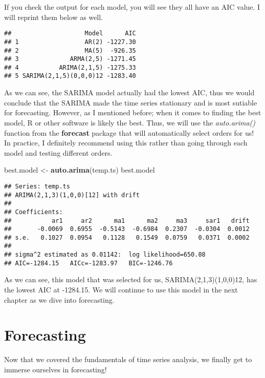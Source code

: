 \documentclass[
]{book}
\newenvironment{Shaded}{\begin{snugshade}}{\end{snugshade}}
\newcommand{\KeywordTok}[1]{\textcolor[rgb]{0.13,0.29,0.53}{\textbf{#1}}}
\newcommand{\NormalTok}[1]{#1}
\newcommand{\StringTok}[1]{\textcolor[rgb]{0.31,0.60,0.02}{#1}}
\begin{document}
If you check the output for each model, you will see they all have an AIC value. I will reprint them below as well.

\begin{verbatim}
##                    Model      AIC
## 1                  AR(2) -1227.30
## 2                  MA(5)  -926.35
## 3              ARMA(2,5) -1271.45
## 4           ARIMA(2,1,5) -1275.33
## 5 SARIMA(2,1,5)(0,0,0)12 -1283.40
\end{verbatim}

As we can see, the SARIMA model actually had the lowest AIC, thus we would conclude that the SARIMA made the time series stationary and is most sutiable for forecasting. However, as I mentioned before; when it comes to finding the best model, R or other software is likely the best. Thus, we will use the \emph{auto.arima()} function from the \textbf{forecast} package that will automatically select orders for us! In practice, I definitely recommend using this rather than going through each model and testing different orders.

\begin{Shaded}
\begin{Highlighting}[]
\NormalTok{best.model <-}\StringTok{ }\KeywordTok{auto.arima}\NormalTok{(temp.ts)}
\NormalTok{best.model}
\end{Highlighting}
\end{Shaded}

\begin{verbatim}
## Series: temp.ts 
## ARIMA(2,1,3)(1,0,0)[12] with drift 
## 
## Coefficients:
##           ar1     ar2      ma1      ma2     ma3     sar1   drift
##       -0.0069  0.6955  -0.5143  -0.6984  0.2307  -0.0304  0.0012
## s.e.   0.1027  0.0954   0.1128   0.1549  0.0759   0.0371  0.0002
## 
## sigma^2 estimated as 0.01142:  log likelihood=650.08
## AIC=-1284.15   AICc=-1283.97   BIC=-1246.76
\end{verbatim}

As we can see, this model that was selected for us, SARIMA(2,1,3)(1,0,0)12, has the lowest AIC at -1284.15. We will continue to use this model in the next chapter as we dive into forecasting.

\hypertarget{forecasting}{%
\chapter{Forecasting}\label{forecasting}}

Now that we covered the fundamentals of time series analysis, we finally get to immerse ourselves in forecasting!
\end{document}
